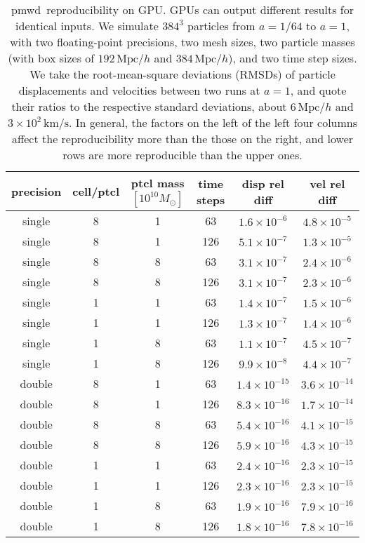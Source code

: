 \documentclass[modern, dvipsnames]{aastex631}
\newcommand{\pmwd}{{\usefont{T1}{nova}{m}{sl}pmwd}}
\newcommand{\Mpc}{\mathrm{Mpc}}
\begin{document}
\begin{table*}[t]
\centering
\caption{\pmwd\ reproducibility on GPU.
GPUs can output different results for identical inputs.
We simulate $384^3$ particles from $a=1/64$ to $a=1$, with two
floating-point precisions, two mesh sizes, two particle masses (with box
sizes of $192 \, \Mpc / h$ and $384 \, \Mpc / h$), and two time step
sizes.
We take the root-mean-square deviations (RMSDs) of particle
displacements and velocities between two runs at $a=1$, and quote their
ratios to the respective standard deviations, about $6 \, \Mpc / h$ and
$3\times10^2 \, \mathrm{km} / \mathrm{s}$.
In general, the factors on the left of the left four columns affect the
reproducibility more than the those on the right, and lower rows are
more reproducible than the upper ones.
}
\label{tab:rep}
\begin{tabular}{cccccc}
  \toprule
  precision & cell/ptcl & ptcl mass $[10^{10} M_\odot]$ & time steps
    & disp rel diff & vel rel diff \\
  \midrule
  single & 8 & 1 &  63 & $1.6\times10^{-6}$  & $4.8\times10^{-5}$  \\
  single & 8 & 1 & 126 & $5.1\times10^{-7}$  & $1.3\times10^{-5}$  \\
  single & 8 & 8 &  63 & $3.1\times10^{-7}$  & $2.4\times10^{-6}$  \\
  single & 8 & 8 & 126 & $3.1\times10^{-7}$  & $2.3\times10^{-6}$  \\
  single & 1 & 1 &  63 & $1.4\times10^{-7}$  & $1.5\times10^{-6}$  \\
  single & 1 & 1 & 126 & $1.3\times10^{-7}$  & $1.4\times10^{-6}$  \\
  single & 1 & 8 &  63 & $1.1\times10^{-7}$  & $4.5\times10^{-7}$  \\
  single & 1 & 8 & 126 & $9.9\times10^{-8}$  & $4.4\times10^{-7}$  \\
  double & 8 & 1 &  63 & $1.4\times10^{-15}$ & $3.6\times10^{-14}$ \\
  double & 8 & 1 & 126 & $8.3\times10^{-16}$ & $1.7\times10^{-14}$ \\
  double & 8 & 8 &  63 & $5.4\times10^{-16}$ & $4.1\times10^{-15}$ \\
  double & 8 & 8 & 126 & $5.9\times10^{-16}$ & $4.3\times10^{-15}$ \\
  double & 1 & 1 &  63 & $2.4\times10^{-16}$ & $2.3\times10^{-15}$ \\
  double & 1 & 1 & 126 & $2.3\times10^{-16}$ & $2.3\times10^{-15}$ \\
  double & 1 & 8 &  63 & $1.9\times10^{-16}$ & $7.9\times10^{-16}$ \\
  double & 1 & 8 & 126 & $1.8\times10^{-16}$ & $7.8\times10^{-16}$ \\
  \bottomrule
\end{tabular}
\end{table*}
\end{document}
